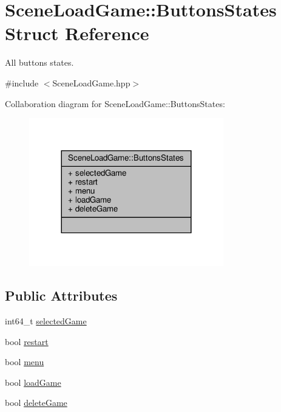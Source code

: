 \hypertarget{struct_scene_load_game_1_1_buttons_states}{}\section{Scene\+Load\+Game\+:\+:Buttons\+States Struct Reference}
\label{struct_scene_load_game_1_1_buttons_states}


All buttons states.  




{\ttfamily \#include $<$Scene\+Load\+Game.\+hpp$>$}



Collaboration diagram for Scene\+Load\+Game\+:\+:Buttons\+States\+:
\nopagebreak
\begin{figure}[H]
\begin{center}
\leavevmode
\includegraphics[width=240pt]{struct_scene_load_game_1_1_buttons_states__coll__graph}
\end{center}
\end{figure}
\subsection*{Public Attributes}
\begin{DoxyCompactItemize}
\item 
int64\+\_\+t \hyperlink{struct_scene_load_game_1_1_buttons_states_a23e5e1bfc6c0fcd8362501554db4c015}{selected\+Game}
\item 
bool \hyperlink{struct_scene_load_game_1_1_buttons_states_a22a840d0d58839802816cce823f034a3}{restart}
\item 
bool \hyperlink{struct_scene_load_game_1_1_buttons_states_a366264c459d2d427b8386b0205ee09e5}{menu}
\item 
bool \hyperlink{struct_scene_load_game_1_1_buttons_states_a2acccb098559eaea7fc90e5f4c3864f1}{load\+Game}
\item 
bool \hyperlink{struct_scene_load_game_1_1_buttons_states_a6f2f36945d5e55ad28a2a6196751da90}{delete\+Game}
\end{DoxyCompactItemize}


